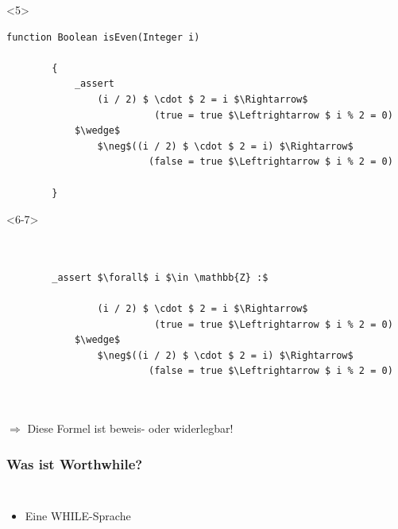 \documentclass[t,svgnames]{beamer}
\begin{document}
\begin{frame}[fragile]
		\begin{onlyenv}<5>
	\begin{lstlisting}[frame=lines,mathescape=true]
		function Boolean isEven(Integer i)
		
		{
		    _assert
		        (i / 2) $ \cdot $ 2 = i $\Rightarrow$
		                  (true = true $\Leftrightarrow $ i % 2 = 0)
		    $\wedge$    	
		        $\neg$((i / 2) $ \cdot $ 2 = i) $\Rightarrow$
		                 (false = true $\Leftrightarrow $ i % 2 = 0)
		        	
		}
	\end{lstlisting}
	\end{onlyenv}
	
	
		\begin{onlyenv}
	\begin{lstlisting}[frame=lines,mathescape=true]
	
		        
		_assert $\forall$ i $\in \mathbb{Z} :$	  
		    
		        (i / 2) $ \cdot $ 2 = i $\Rightarrow$
		                  (true = true $\Leftrightarrow $ i % 2 = 0)
		    $\wedge$    	
		        $\neg$((i / 2) $ \cdot $ 2 = i) $\Rightarrow$
		                 (false = true $\Leftrightarrow $ i % 2 = 0)
		        	
		
	\end{lstlisting}
	\end{onlyenv}
	
	\vspace{1cm}
	
	 {
		$\Rightarrow$ Diese Formel ist beweis- oder widerlegbar!
	}
\end{frame}

\begin{frame}
	\frametitle{Was ist Worthwhile?}

	\begin{columns}[c]
			\begin{itemize}
			\item Eine WHILE-Sprache
			\end{itemize}
	\end{columns}
\end{frame}

\lstset{
   basicstyle=\scriptsize\ttfamily
}
\end{document}
